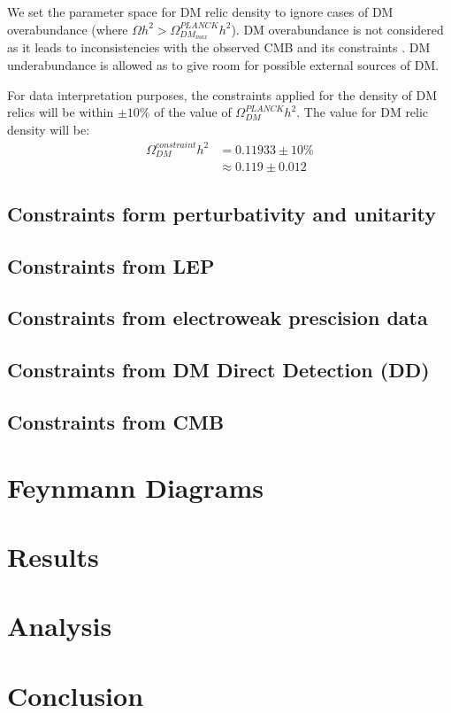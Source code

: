 \documentclass[12pt]{article}
\begin{document}
We set the parameter space for DM relic density to ignore cases of DM overabundance (where $\Omega h^2 > \Omega^{PLANCK}_{DM_{max}}h^2$). DM overabundance is not considered as it leads to inconsistencies with the observed CMB and its constraints \cite{Croon_2024, Zavala_2010}. DM underabundance is allowed as to give room for possible external sources of DM.

For data interpretation purposes, the constraints applied for the density of DM relics will be within $\pm10\%$ of the value of $\Omega ^{PLANCK}_{DM} h^2$. The value for DM relic density will be:
\begin{align}
    \Omega^{constraint}_{DM} h^2 &= 0.11933 \pm 10\% \\ &\approx 0.119 \pm 0.012
\end{align}

\subsection{Constraints form perturbativity and unitarity}

\subsection{Constraints from LEP}

\subsection{Constraints from electroweak prescision data}

\subsection{Constraints from DM Direct Detection (DD)}

\subsection{Constraints from CMB}

\subsection{}

\section{Feynmann Diagrams}

\section{Results}
\label{sec:results}

\section{Analysis}
\label{sec:analysis}

\section{Conclusion}
\label{sec:conclusion}

\newpage


\end{document}
